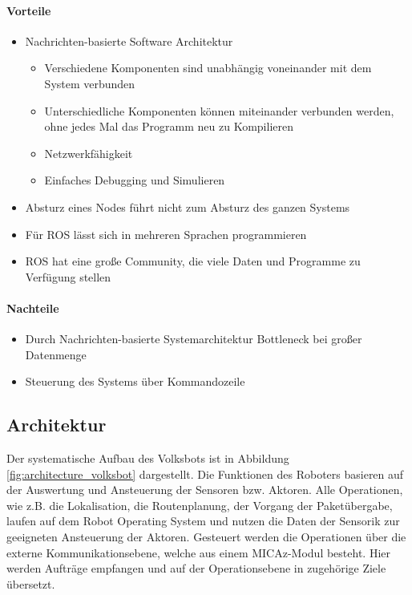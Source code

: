 \paragraph{Vorteile}
\begin{itemize}
 \item Nachrichten-basierte Software Architektur
\begin{itemize}
\item Verschiedene Komponenten sind unabhängig voneinander mit dem System verbunden
\item Unterschiedliche Komponenten können miteinander verbunden werden, ohne jedes Mal das Programm neu zu Kompilieren
\item Netzwerkfähigkeit
\item Einfaches Debugging und Simulieren
\end{itemize}
\item Absturz eines Nodes führt nicht zum Absturz des ganzen
Systems
\item Für ROS lässt sich in mehreren Sprachen programmieren
\item ROS hat eine große Community, die viele Daten und Programme zu Verfügung
stellen
\end{itemize}
\paragraph{Nachteile}
\begin{itemize}
 \item Durch Nachrichten-basierte Systemarchitektur Bottleneck bei großer Datenmenge
\item Steuerung des Systems über Kommandozeile
\end{itemize}

\subsection{Architektur}

Der systematische Aufbau des Volksbots ist in Abbildung \ref{fig:architecture_volksbot} dargestellt. Die Funktionen des Roboters basieren auf der Auswertung und Ansteuerung der Sensoren bzw. Aktoren. Alle Operationen, wie z.B. die Lokalisation, die Routenplanung, der Vorgang der Paketübergabe, laufen auf dem Robot Operating System und nutzen die Daten der Sensorik zur geeigneten Ansteuerung der Aktoren. Gesteuert werden die Operationen über die externe Kommunikationsebene, welche aus einem MICAz-Modul besteht. Hier werden Aufträge empfangen und auf der Operationsebene in zugehörige Ziele übersetzt.

